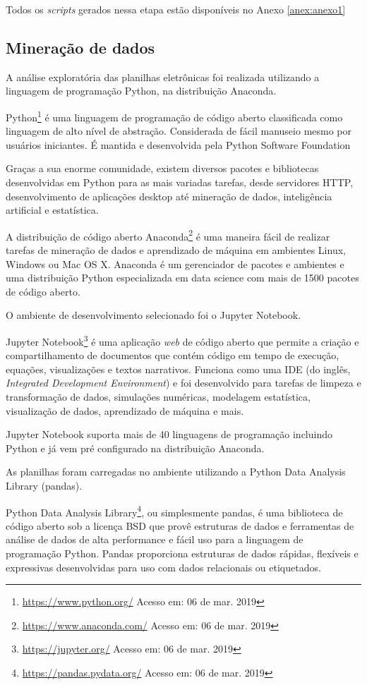 Todos os \textit{scripts} gerados nessa etapa estão disponíveis no Anexo
\ref{anex:anexo1}

\subsection{Mineração de dados}

A análise exploratória das planilhas eletrônicas foi realizada utilizando a
linguagem de programação Python, na distribuição Anaconda.

Python\footnote{\url{https://www.python.org/} Acesso em: 06 de mar. 2019} é uma
linguagem de programação de código aberto classificada como linguagem de alto
nível de abstração. Considerada de fácil manuseio mesmo por usuários iniciantes.
É mantida e desenvolvida pela Python Software Foundation

Graças a sua enorme comunidade, existem diversos pacotes e bibliotecas
desenvolvidas em Python para as mais variadas tarefas, desde servidores HTTP,
desenvolvimento de aplicações desktop até mineração de dados, inteligência
artificial e estatística.

A distribuição de código aberto
Anaconda\footnote{\url{https://www.anaconda.com/} Acesso em: 06 de mar. 2019}  é
uma maneira fácil de realizar tarefas de mineração de dados e aprendizado de
máquina em ambientes Linux, Windows ou Mac OS X. Anaconda é um gerenciador de
pacotes e ambientes e uma distribuição Python especializada em data science com
mais de 1500 pacotes de código aberto.

O ambiente de desenvolvimento selecionado foi o Jupyter Notebook.

Jupyter Notebook\footnote{\url{https://jupyter.org/} Acesso em: 06 de mar. 2019}
é uma aplicação \textit{web} de código aberto que permite a criação e
compartilhamento de documentos que contém código em tempo de execução, equações,
visualizações e textos narrativos. Funciona como uma IDE (do inglês,
\textit{Integrated Development Environment}) e foi desenvolvido para tarefas de
limpeza e transformação de dados, simulações numéricas, modelagem estatística,
visualização de dados, aprendizado de máquina e mais.

Jupyter Notebook suporta mais de 40 linguagens de programação incluindo Python e
já vem pré configurado na distribuição Anaconda.

As planilhas foram carregadas no ambiente utilizando a Python Data Analysis
Library (pandas).

Python Data Analysis Library\footnote{\url{https://pandas.pydata.org/} Acesso
em: 06 de mar. 2019}, ou simplesmente pandas, é uma biblioteca de código aberto
sob a licença BSD que provê estruturas de dados e ferramentas de análise de
dados de alta performance e fácil uso para a linguagem de programação Python.
Pandas proporciona estruturas de dados rápidas, flexíveis e expressivas
desenvolvidas para uso com dados relacionais ou etiquetados.

